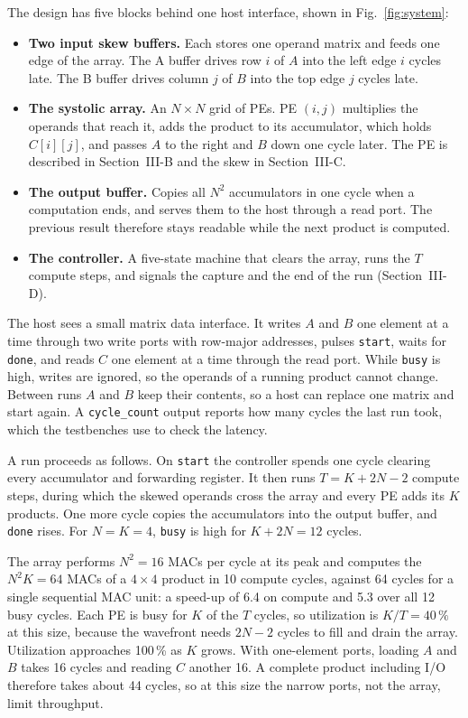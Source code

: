 The design has five blocks behind one host interface, shown in Fig.~\ref{fig:system}:
\begin{itemize}
\item \textbf{Two input skew buffers.} Each stores one operand matrix and feeds one edge of the array. The A buffer drives row $i$ of $A$ into the left edge $i$ cycles late. The B buffer drives column $j$ of $B$ into the top edge $j$ cycles late.
\item \textbf{The systolic array.} An $N \times N$ grid of PEs. PE $(i,j)$ multiplies the operands that reach it, adds the product to its accumulator, which holds $C[i][j]$, and passes $A$ to the right and $B$ down one cycle later. The PE is described in Section~III-B and the skew in Section~III-C.
\item \textbf{The output buffer.} Copies all $N^2$ accumulators in one cycle when a computation ends, and serves them to the host through a read port. The previous result therefore stays readable while the next product is computed.
\item \textbf{The controller.} A five-state machine that clears the array, runs the $T$ compute steps, and signals the capture and the end of the run (Section~III-D).
\end{itemize}

The host sees a small matrix data interface. It writes $A$ and $B$ one element at a time through two write ports with row-major addresses, pulses \texttt{start}, waits for \texttt{done}, and reads $C$ one element at a time through the read port. While \texttt{busy} is high, writes are ignored, so the operands of a running product cannot change. Between runs $A$ and $B$ keep their contents, so a host can replace one matrix and start again. A \texttt{cycle\_count} output reports how many cycles the last run took, which the testbenches use to check the latency.

A run proceeds as follows. On \texttt{start} the controller spends one cycle clearing every accumulator and forwarding register. It then runs $T = K + 2N - 2$ compute steps, during which the skewed operands cross the array and every PE adds its $K$ products. One more cycle copies the accumulators into the output buffer, and \texttt{done} rises. For $N = K = 4$, \texttt{busy} is high for $K + 2N = 12$ cycles.

The array performs $N^2 = 16$ MACs per cycle at its peak and computes the $N^2K = 64$ MACs of a $4 \times 4$ product in 10 compute cycles, against 64 cycles for a single sequential MAC unit: a speed-up of 6.4 on compute and 5.3 over all 12 busy cycles. Each PE is busy for $K$ of the $T$ cycles, so utilization is $K/T = 40\,\%$ at this size, because the wavefront needs $2N - 2$ cycles to fill and drain the array. Utilization approaches 100\,\% as $K$ grows. With one-element ports, loading $A$ and $B$ takes 16 cycles and reading $C$ another 16. A complete product including I/O therefore takes about 44 cycles, so at this size the narrow ports, not the array, limit throughput.

